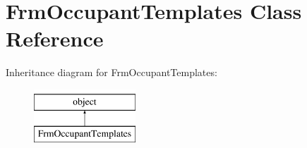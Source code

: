 \hypertarget{class_f_occupant_templates_1_1_frm_occupant_templates}{}\section{Frm\+Occupant\+Templates Class Reference}
\label{class_f_occupant_templates_1_1_frm_occupant_templates}
Inheritance diagram for Frm\+Occupant\+Templates\+:\begin{figure}[H]
\begin{center}
\leavevmode
\includegraphics[height=2.000000cm]{class_f_occupant_templates_1_1_frm_occupant_templates}
\end{center}
\end{figure}
